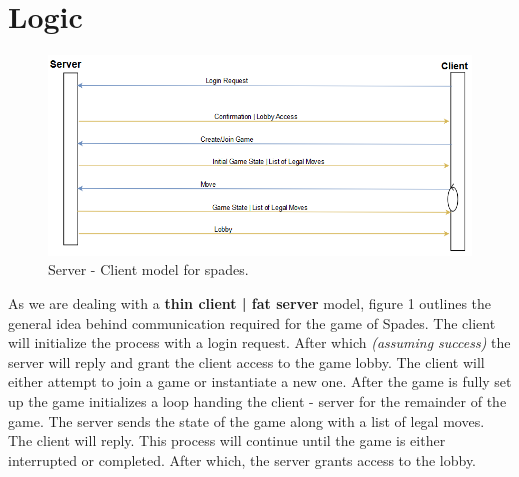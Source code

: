 \documentclass[journal, a4paper]{Spades_Logic_Dependency/IEEEtran}
\begin{document}
\section{Logic}
	



	
	\begin{figure}[!hbt]
		\begin{center}
		\includegraphics[width=\columnwidth]{graphics/clientServer}
		\caption{Server - Client model for spades.}
		\label{Figure 1}
		\end{center}
	\end{figure}
	
	As we are dealing with a \textbf{thin client | fat server} model, figure 1 outlines the general idea behind communication required for the game of Spades. The client will initialize the process with a login request. After which \textit{(assuming success)} the server will reply and grant the client access to the game lobby. The client will either attempt to join a game or instantiate a new one. After the game is fully set up the game initializes a loop handing the client - server for the remainder of the game. The server sends the state of the game along with a list of legal moves. The client will reply. This process will continue until the game is either interrupted or completed. After which, the server grants access to the lobby.  
	
\end{document}
